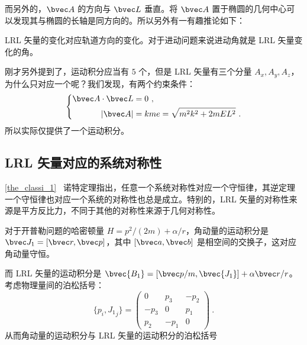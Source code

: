 而另外的，$\bvec A$ 的方向与 $\bvec L$ 垂直。将 $\bvec A$ 置于椭圆的几何中心可以发现其与椭圆的长轴是同方向的。所以另外有一有趣推论如下：
\begin{corollary}{}
LRL 矢量的变化对应轨道方向的变化。对于进动问题来说进动角就是 LRL 矢量变化的角。
\end{corollary}

刚才另外提到了，运动积分应当有 $5$ 个，但是 LRL 矢量有三个分量 $A_x, A_y, A_z$，为什么只对应一个呢？我们发现，有两个约束条件：
\begin{equation}
\left\{
\begin{aligned}
\bvec A \cdot \bvec L &= 0 ~, \\
|\bvec A| &= kme = \sqrt{m^2k^2 + 2m E L^2} ~. 
\end{aligned}
\right.
\end{equation}
所以实际仅提供了一个运动积分。

\subsection{LRL 矢量对应的系统对称性}
\autoref{the_classi_1}~ 诺特定理指出，任意一个系统对称性对应一个守恒律，其逆定理一个守恒律也对应一个系统的对称性也总是成立。特别的，LRL 矢量的对称性来源是平方反比力，不同于其他的对称性来源于几何对称性。

对于开普勒问题的哈密顿量 $H = p^2/(2m) + \alpha/r$，角动量的运动积分是 $\bvec J_1 = [\bvec r, \bvec p]$，其中 $[\bvec a, \bvec b]$ 是相空间的交换子，这对应角动量守恒。

而 LRL 矢量的运动积分是 $\bvec{B_1} = [\bvec p/m, \bvec{J_1}] + \alpha \bvec r / r$。考虑物理量间的泊松括号：
\begin{equation}
\{p_i, {J_1}_{j}\} = \begin{pmatrix}
0 & p_3 & -p_2 \\
-p_3 & 0 & p_1 \\
p_2 & -p_1 & 0
\end{pmatrix}~.
\end{equation}
从而角动量的运动积分与 LRL 矢量的运动积分的泊松括号
\begin{equation}

\end{equation}
